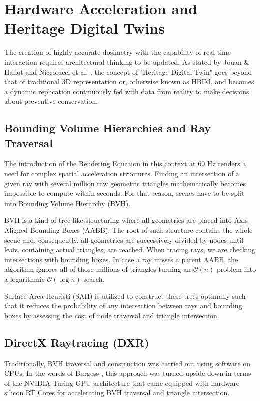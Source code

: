 \section{Hardware Acceleration and Heritage Digital Twins}

The creation of highly accurate dosimetry with the capability of real-time interaction requires architectural thinking to be updated. As stated by Jouan \& Hallot \cite{jouan2020digital} and Niccolucci et al. \cite{niccolucci2022digital}, the concept of "Heritage Digital Twin" goes beyond that of traditional 3D representation or, otherwise known as HBIM, and becomes a dynamic replication continuously fed with data from reality to make decisions about preventive conservation.

\subsection{Bounding Volume Hierarchies and Ray Traversal}
The introduction of the Rendering Equation in this context at 60 Hz renders a need for complex spatial acceleration structures. Finding an intersection of a given ray with several million raw geometric triangles mathematically becomes impossible to compute within seconds. For that reason, scenes have to be split into Bounding Volume Hierarchy (BVH).

BVH is a kind of tree-like structuring where all geometries are placed into Axis-Aligned Bounding Boxes (AABB). The root of such structure contains the whole scene and, consequently, all geometries are successively divided by nodes until leafs, containing actual triangles, are reached. When tracing rays, we are checking intersections with bounding boxes. In case a ray misses a parent AABB, the algorithm ignores all of those millions of triangles turning an  $\mathcal{O}(n)$ problem into a logarithmic $\mathcal{O}(\log n)$ search.

Surface Area Heuristi (SAH) is utilized to construct these trees optimally such that it reduces the probability of any intersection between rays and bounding boxes by assessing the cost of node traversal and triangle intersection.

\subsection{DirectX Raytracing (DXR)}
Traditionally, BVH traversal and construction was carried out using software on CPUs. In the words of Burgess \cite{burgess2020rtx}, this approach was turned upside down in terms of the NVIDIA Turing GPU architecture that came equipped with hardware silicon RT Cores for accelerating BVH traversal and triangle intersection.

